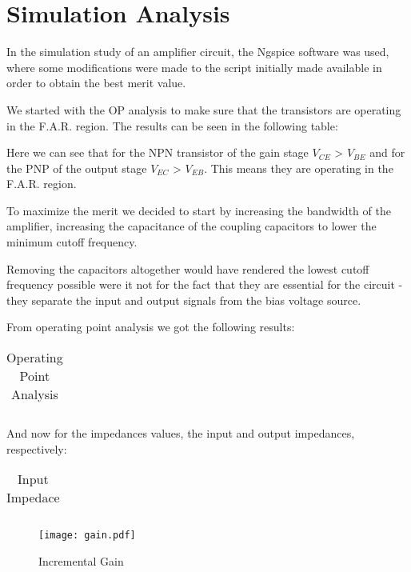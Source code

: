 \section{Simulation Analysis}
\label{sec:simulation} 

In the simulation study of an amplifier circuit, the Ngspice software was used, where some modifications were made to the script initially made available in order to obtain the best merit value.

We started with the OP analysis to make sure that the transistors are operating in the F.A.R. region. The results can be seen in the following table:

Here we can see that for the NPN transistor of the gain stage $V_{CE}$ > $V_{BE}$ and for the PNP of the output stage $V_{EC}$ > $V_{EB}$. This means they are operating in the F.A.R. region.

To maximize the merit we decided to start by increasing the bandwidth of the amplifier, increasing the capacitance of the coupling capacitors to lower the minimum cutoff frequency.

Removing the capacitors altogether would have rendered the lowest cutoff frequency possible were it not for the fact that they are essential for the circuit - they separate the input and output signals from the bias voltage source.


From operating point analysis we got the following results:
\FloatBarrier
\begin{table}[h]
  \centering
  \begin{tabular}{|c|c|c|c|c|}
    \hline    
    
    \hline
  \end{tabular}
  \caption{Operating Point Analysis}
  \label{tab:Spice1}
\end{table}
\FloatBarrier  

And now for the impedances values, the input and output impedances, respectively:

\FloatBarrier
\begin{table}[h]
  \centering
  \begin{tabular}{|c|c|}
    \hline    
    
    \hline
  \end{tabular}
  \caption{Input Impedace}
  \label{tab:Spice1}
\end{table}
\FloatBarrier   

%    

\begin{figure} [!htb] 
  \texttt{[image: gain.pdf]}
  \caption{Incremental Gain}
  \label{fig:theoplots}
  \endminipage\hfill
\end{figure}



